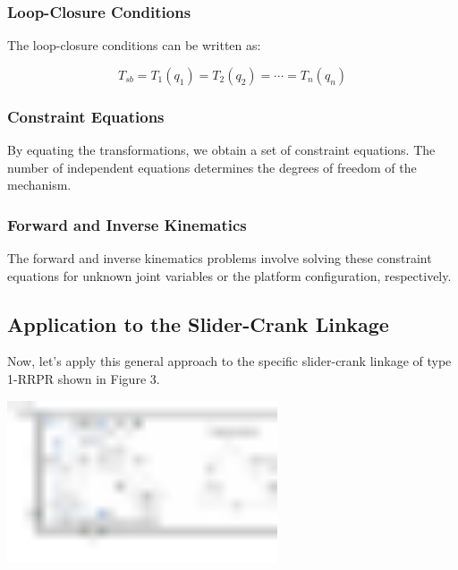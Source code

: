 \begin{solution}
    \subsubsection*{Loop-Closure Conditions}
    
    The loop-closure conditions can be written as:
    
    \begin{equation}
    T_{sb} = T_1(q_1) = T_2(q_2) = \cdots = T_n(q_n)
    \end{equation}
    
    \subsubsection*{Constraint Equations}
    
    By equating the transformations, we obtain a set of constraint equations. The number of independent equations determines the degrees of freedom of the mechanism.
    
    \subsubsection*{Forward and Inverse Kinematics}
    
    The forward and inverse kinematics problems involve solving these constraint equations for unknown joint variables or the platform configuration, respectively.
    
    \subsection*{Application to the Slider-Crank Linkage}
    
    Now, let's apply this general approach to the specific slider-crank linkage of type 1-RRPR shown in Figure 3.
    
    \begin{center}
    \includegraphics[width=0.6\textwidth]{slider_crank_linkage.pdf}
    \label{fig:slider_crank}
    \end{center}
    

\end{solution}
